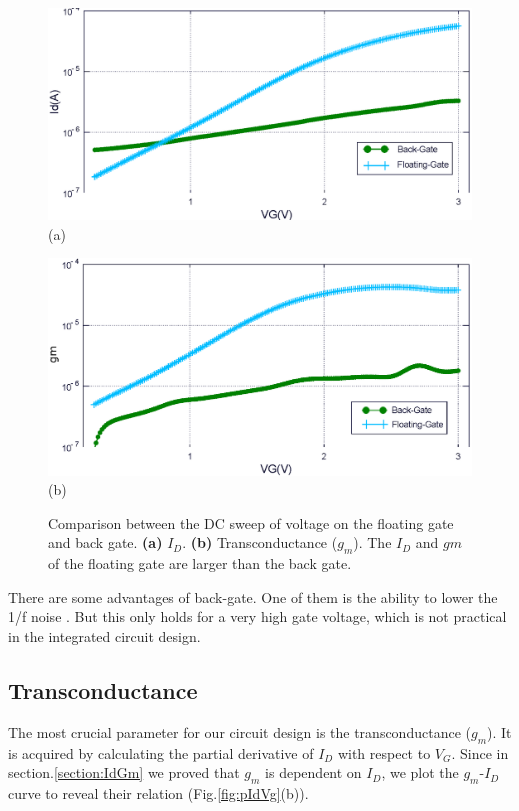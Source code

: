 \begin{figure}[tbp]
    \centering
    \begin{minipage}[t]{1\textwidth}
        \centering
        \includegraphics[width=1\textwidth]{images/chapter3/FgBg_Compare_Id.eps}
        \raggedleft
        (a)
    \end{minipage}
    \vfill
    \begin{minipage}[t]{1\textwidth}
        \centering
        \includegraphics[width=1\textwidth]{images/chapter3/FgBg_Compare_Id_dev.eps}
        \raggedleft
        (b)
    \end{minipage}
    \caption{Comparison between the DC sweep of voltage on the floating gate and back gate. \textbf{(a)} $I_D$. \textbf{(b)} Transconductance ($g_m$). The $I_D$ and $gm$ of the floating gate are larger than the back gate.}
    \label{fig:IdVgandgbsId}
\end{figure}


There are some advantages of back-gate.
One of them is the ability to lower the 1/f noise \cite{C7, C8}.
But this only holds for a very high gate voltage, which is not practical in the integrated circuit design.

\subsection{Transconductance}
The most crucial parameter for our circuit design is the transconductance ($g_m$).
It is acquired by calculating the partial derivative of $I_D$ with respect to $V_{G}$.
Since in section.\ref{section:IdGm} we proved that $g_m$ is dependent on $I_D$, we plot the $g_m$-$I_D$ curve to reveal their relation (Fig.\ref{fig:pIdVg}(b)).

